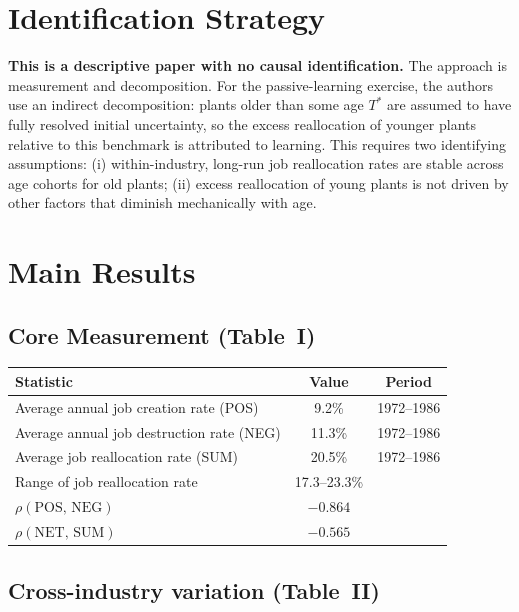 \section{Identification Strategy}

\textbf{This is a descriptive paper with no causal identification.} The
approach is measurement and decomposition. For the passive-learning exercise,
the authors use an indirect decomposition: plants older than some age $T^{*}$
are assumed to have fully resolved initial uncertainty, so the excess
reallocation of younger plants relative to this benchmark is attributed to
learning. This requires two identifying assumptions: (i) within-industry,
long-run job reallocation rates are stable across age cohorts for old plants;
(ii) excess reallocation of young plants is not driven by other factors
that diminish mechanically with age.

\section{Main Results}

\subsection*{Core Measurement (Table~I)}

\begin{center}
\begin{tabular}{lcc}
\toprule
\textbf{Statistic} & \textbf{Value} & \textbf{Period} \\
\midrule
Average annual job creation rate (POS) & 9.2\% & 1972--1986 \\
Average annual job destruction rate (NEG) & 11.3\% & 1972--1986 \\
Average job reallocation rate (SUM) & 20.5\% & 1972--1986 \\
Range of job reallocation rate & 17.3--23.3\% & \\
$\rho(\text{POS},\,\text{NEG})$ & $-0.864$ & \\
$\rho(\text{NET},\,\text{SUM})$ & $-0.565$ & \\
\bottomrule
\end{tabular}
\end{center}

\subsection*{Cross-industry variation (Table~II)}

